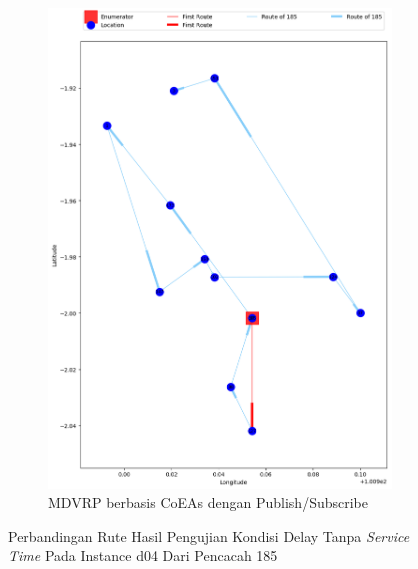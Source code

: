\begin{figure}[H]\ContinuedFloat
	\centering
	\begin{subfigure}[t]{\textwidth}
		\centering
		\includegraphics[width=\textwidth]{Resources/Images/delayed_5/real_m15_n100_delayed_5_185_pubsub_coes}
		\caption{MDVRP berbasis CoEAs dengan Publish/Subscribe}
		\label{fig:real_m15_n100_delayed_5_185_pubsub_coes}
	\end{subfigure}
	\caption{Perbandingan Rute Hasil Pengujian Kondisi Delay Tanpa \textit{Service Time} Pada Instance d04 Dari Pencacah 185}
	\label{fig:real_m15_n100_delayed_5_185_contd}
\end{figure}


